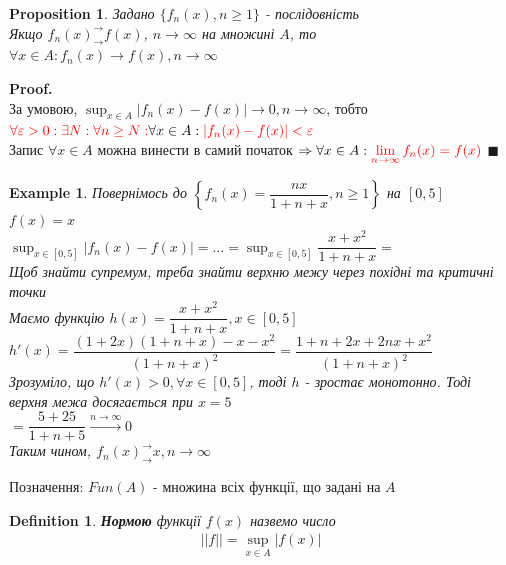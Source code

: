 \documentclass[a4paper, 14pt]{extarticle}
\def\huge{\displaystyle}
\theoremstyle{theoremdd}
\theoremstyle{theoremdd}
\newtheorem{definition}[theorem]{Definition}
\theoremstyle{theoremdd}
\theoremstyle{theoremdd}
\newtheorem{example}[theorem]{Example}
\theoremstyle{theoremdd}
\newtheorem{proposition}[theorem]{Proposition}
\theoremstyle{theoremdd}
\theoremstyle{theoremdd}
\theoremstyle{theoremdd}
\newenvironment{pf}{\vspace*{-3mm} \textbf{Proof. \\}}{$\blacksquare$}
\begin{document}
\begin{proposition}
Задано $\{f_n(x), n \geq 1\}$ - послідовність\\
Якщо $f_n(x)^\rightarrow_\rightarrow f(x)$, $n \to \infty$ на множині $A$, то \\ $\forall x \in A: f_n(x) \to f(x), n \to \infty$
\end{proposition}

\begin{pf}
За умовою, $\huge \sup_{x \in A} |f_n(x) - f(x)| \to 0, n \to \infty$, тобто\\
$\textcolor{red}{\forall \varepsilon > 0: \exists N: \forall n \geq N:} \forall x \in A: \textcolor{red}{|f_n(x) - f(x)| < \varepsilon}$\\
Запис $\forall x \in A$ можна винести в самий початок $\Rightarrow \forall x \in A: \textcolor{red}{\huge\lim_{n \to \infty} f_n(x) = f(x)}$
\end{pf}

\begin{example}
Повернімось до $\left\{f_n(x) = \dfrac{nx}{1+n+x}, n \geq 1 \right\}$ на $[0,5]$\\
$f(x) = x$\\
$\huge \sup_{x \in [0,5]} |f_n(x) - f(x)| = \dots = \sup_{x \in [0,5]} \dfrac{x+x^2}{1+n+x} \boxed{=}$\\
Щоб знайти супремум, треба знайти верхню межу через похідні та критичні точки\\
Маємо функцію $h(x) = \dfrac{x+x^2}{1+n+x}, x \in [0,5]$\\
$h'(x) = \dfrac{(1+2x)(1+n+x) - x-x^2}{(1+n+x)^2} = \dfrac{1+n+2x+2nx+x^2}{(1+n+x)^2}$\\
Зрозуміло, що $h'(x) > 0, \forall x \in [0,5]$, тоді $h$ - зростає монотонно. Тоді верхня межа досягається при $x = 5$\\
$\boxed{=} \dfrac{5+25}{1+n+5} \overset{n \to \infty}{\longrightarrow} 0$\\
Таким чином, $f_n(x)^\rightarrow_\rightarrow x, n \to \infty$
\end{example}

Позначення: $Fun(A)$ - множина всіх функції, що задані на  $A$

\begin{definition}
\textbf{Нормою} функції $f(x)$ назвемо число
\begin{align*}
||f|| = \sup_{x \in A} |f(x)|
\end{align*}
\end{definition}
\end{document}
